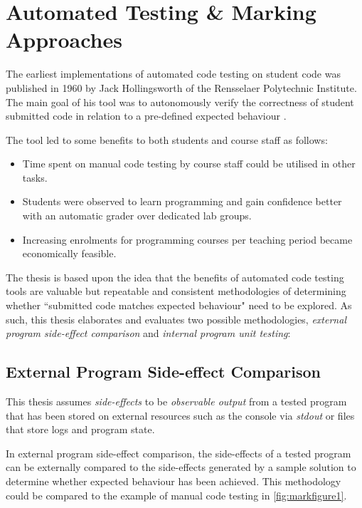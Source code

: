 \documentclass[hidelinks, 12pt]{extreport}
\begin{document}
\section{Automated Testing \& Marking Approaches}

The earliest implementations of automated code testing on student code was published in 1960 by Jack Hollingsworth of the Rensselaer Polytechnic Institute. The main goal of his tool was to autonomously verify the correctness of student submitted code in relation to a pre-defined expected behaviour \cite{AutomatedFirst}.

The tool led to some benefits to both students and course staff as follows:
\begin{itemize}
	\item Time spent on manual code testing by course staff could be utilised in other tasks.
	\item Students were observed to learn programming and gain confidence better with an automatic grader over dedicated lab groups.
	\item Increasing enrolments for programming courses per teaching period became economically feasible.
\end{itemize}

The thesis is based upon the idea that the benefits of automated code testing tools are valuable but repeatable and consistent methodologies of determining whether ``submitted code matches expected behaviour" need to be explored. As such, this thesis elaborates and evaluates two possible methodologies, \textit{external program side-effect comparison} and \textit{internal program unit testing}: 

\subsection{External Program Side-effect Comparison}

This thesis assumes \textit{side-effects} to be \textit{observable output} from a tested program that has been stored on external resources such as the console via \textit{stdout} or files that store logs and program state.

In external program side-effect comparison, the side-effects of a tested program can be externally compared to the side-effects generated by a sample solution to determine whether expected behaviour has been achieved. This methodology could be compared to the example of manual code testing in \autoref{fig:markfigure1}.
\end{document}
